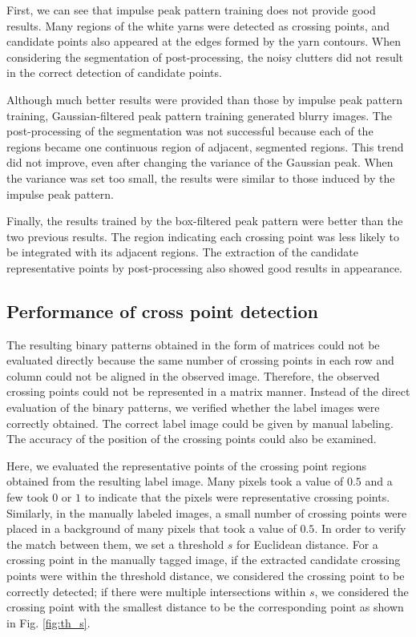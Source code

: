 First, we can see that impulse peak pattern training does not provide good results. Many regions of the white yarns were detected as crossing points, and candidate points also appeared at the edges formed by the yarn contours. When considering the segmentation of post-processing, the noisy clutters did not result in the correct detection of candidate points.

Although much better results were provided than those by impulse peak pattern training, Gaussian-filtered peak pattern training generated blurry images. The post-processing of the segmentation was not successful because each of the regions became one continuous region of adjacent, segmented regions. This trend did not improve, even after changing the variance of the Gaussian peak. When the variance was set too small, the results were similar to those induced by the impulse peak pattern.

Finally, the results trained by the box-filtered peak pattern were better than the two previous results. The region indicating each crossing point was less likely to be integrated with its adjacent regions. The extraction of the candidate representative points by post-processing also showed good results in appearance.


\subsection{Performance of cross point detection}

The resulting binary patterns obtained in the form of matrices could not be evaluated directly because the same number of crossing points in each row and column could not be aligned in the observed image. Therefore, the observed crossing points could not be represented in a matrix manner. Instead of the direct evaluation of the binary patterns, we verified whether the label images were correctly obtained. The correct label image could be given by manual labeling. The accuracy of the position of the crossing points could also be examined.

Here, we evaluated the representative points of the crossing point regions obtained from the resulting label image. Many pixels took a value of $0.5$ and a few took $0$ or $1$ to indicate that the pixels were representative crossing points. Similarly, in the manually labeled images, a small number of crossing points were placed in a background of many pixels that took a value of $0.5$. In order to verify the match between them, we set a threshold $s$ for Euclidean distance. For a crossing point in the manually tagged image, if the extracted candidate crossing points were within the threshold distance, we considered the crossing point to be correctly detected; if there were multiple intersections within $s$, we considered the crossing point with the smallest distance to be the corresponding point as shown in Fig. \ref{fig:th_s}. 

